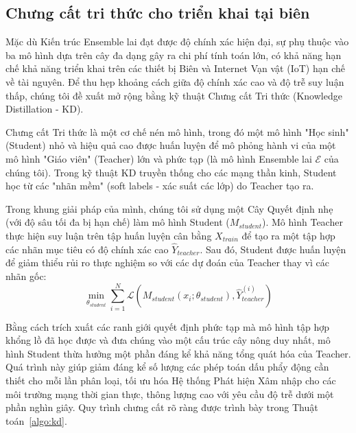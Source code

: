 \subsection{Chưng cất tri thức cho triển khai tại biên}
Mặc dù Kiến trúc Ensemble lai đạt được độ chính xác hiện đại, sự phụ thuộc vào ba mô hình dựa trên cây đa dạng gây ra chi phí tính toán lớn, có khả năng hạn chế khả năng triển khai trên các thiết bị Biên và Internet Vạn vật (IoT) hạn chế về tài nguyên. Để thu hẹp khoảng cách giữa độ chính xác cao và độ trễ suy luận thấp, chúng tôi đề xuất mở rộng bằng kỹ thuật Chưng cất Tri thức (Knowledge Distillation - KD).

Chưng cất Tri thức là một cơ chế nén mô hình, trong đó một mô hình "Học sinh" (Student) nhỏ và hiệu quả cao được huấn luyện để mô phỏng hành vi của một mô hình "Giáo viên" (Teacher) lớn và phức tạp \cite{hinton2015distilling} (là mô hình Ensemble lai $\mathcal{E}$ của chúng tôi). Trong kỹ thuật KD truyền thống cho các mạng thần kinh, Student học từ các "nhãn mềm" (soft labels - xác suất các lớp) do Teacher tạo ra.

Trong khung giải pháp của mình, chúng tôi sử dụng một Cây Quyết định nhẹ (với độ sâu tối đa bị hạn chế) làm mô hình Student ($M_{student}$). Mô hình Teacher thực hiện suy luận trên tập huấn luyện cân bằng $X_{train}$ để tạo ra một tập hợp các nhãn mục tiêu có độ chính xác cao $\hat{Y}_{teacher}$. Sau đó, Student được huấn luyện để giảm thiểu rủi ro thực nghiệm so với các dự đoán của Teacher thay vì các nhãn gốc:
\begin{equation}
    \min_{\theta_{student}} \sum_{i=1}^{N} \mathcal{L}\left( M_{student}(x_i; \theta_{student}), \hat{Y}_{teacher}^{(i)} \right)
\end{equation}

Bằng cách trích xuất các ranh giới quyết định phức tạp mà mô hình tập hợp khổng lồ đã học được và đưa chúng vào một cấu trúc cây nông duy nhất, mô hình Student thừa hưởng một phần đáng kể khả năng tổng quát hóa của Teacher. Quá trình này giúp giảm đáng kể số lượng các phép toán dấu phẩy động cần thiết cho mỗi lần phân loại, tối ưu hóa Hệ thống Phát hiện Xâm nhập cho các môi trường mạng thời gian thực, thông lượng cao với yêu cầu độ trễ dưới một phần nghìn giây. Quy trình chưng cất rõ ràng được trình bày trong Thuật toán~\ref{algo:kd}.

